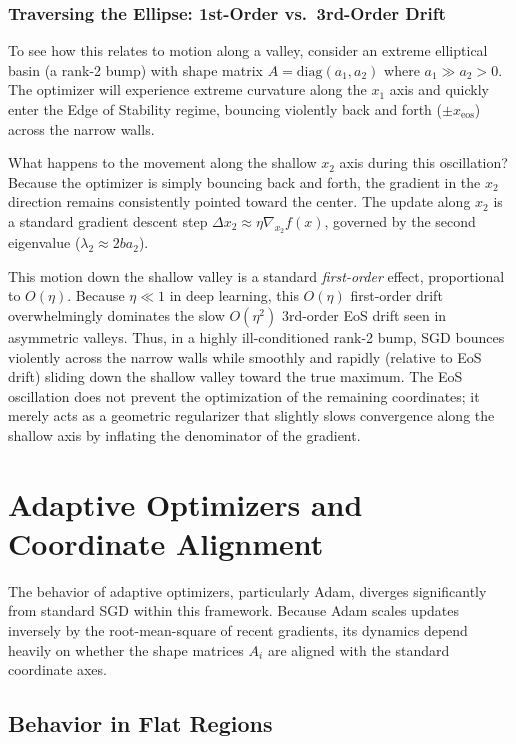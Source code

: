 \documentclass{article}
\begin{document}
\subsubsection*{Traversing the Ellipse: 1st-Order vs.\ 3rd-Order Drift}

To see how this relates to motion along a valley, consider an extreme elliptical basin (a rank-2 bump) with shape matrix $A = \text{diag}(a_1, a_2)$ where $a_1 \gg a_2 > 0$. The optimizer will experience extreme curvature along the $x_1$ axis and quickly enter the Edge of Stability regime, bouncing violently back and forth ($\pm x_{\text{eos}}$) across the narrow walls. 

What happens to the movement along the shallow $x_2$ axis during this oscillation? Because the optimizer is simply bouncing back and forth, the gradient in the $x_2$ direction remains consistently pointed toward the center. The update along $x_2$ is a standard gradient descent step $\Delta x_2 \approx \eta \nabla_{x_2} f(x)$, governed by the second eigenvalue ($\lambda_2 \approx 2b a_2$). 

This motion down the shallow valley is a standard \emph{first-order} effect, proportional to $O(\eta)$. Because $\eta \ll 1$ in deep learning, this $O(\eta)$ first-order drift overwhelmingly dominates the slow $O(\eta^2)$ 3rd-order EoS drift seen in asymmetric valleys. Thus, in a highly ill-conditioned rank-2 bump, SGD bounces violently across the narrow walls while smoothly and rapidly (relative to EoS drift) sliding down the shallow valley toward the true maximum. The EoS oscillation does not prevent the optimization of the remaining coordinates; it merely acts as a geometric regularizer that slightly slows convergence along the shallow axis by inflating the denominator of the gradient.

\section{Adaptive Optimizers and Coordinate Alignment}

The behavior of adaptive optimizers, particularly Adam, diverges significantly from standard SGD within this framework. Because Adam scales updates inversely by the root-mean-square of recent gradients, its dynamics depend heavily on whether the shape matrices $A_i$ are aligned with the standard coordinate axes.

\subsection{Behavior in Flat Regions}
\end{document}
